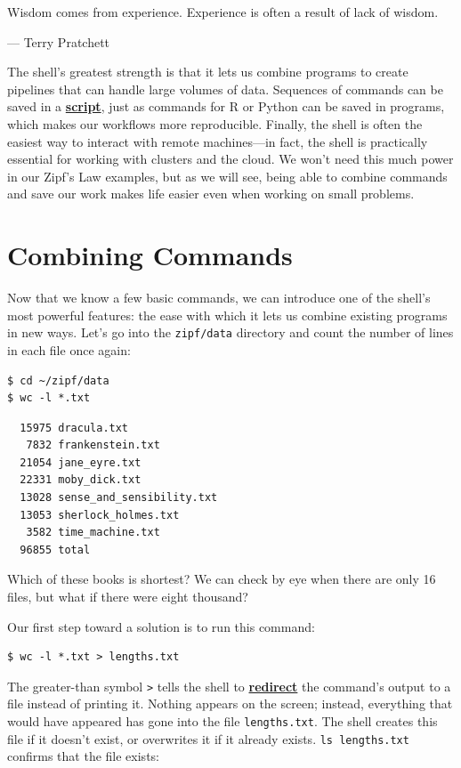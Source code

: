 \documentclass[
]{krantz}
\renewenvironment{quote}{\begin{VF}}{\end{VF}}
\newcommand{\gref}[2]{\hyperlink{#2}{\textbf{#1}}}
\begin{document}
\begin{quote}
Wisdom comes from experience. Experience is often a result of lack of wisdom.

--- Terry Pratchett
\end{quote}

The shell's greatest strength is that
it lets us combine programs to create pipelines
that can handle large volumes of data.
Sequences of commands can be saved in a \gref{script}{script},
just as commands for R or Python can be saved in programs,
which makes our workflows more reproducible.
Finally,
the shell is often the easiest way to interact with remote machines---in fact,
the shell is practically essential for working with clusters and the cloud.
We won't need this much power in our Zipf's Law examples,
but as we will see,
being able to combine commands and save our work
makes life easier even when working on small problems.

\hypertarget{bash-tools-pipe}{%
\section{Combining Commands}\label{bash-tools-pipe}}

Now that we know a few basic commands,
we can introduce one of the shell's most powerful features:
the ease with which it lets us combine existing programs in new ways.
Let's go into the \texttt{zipf/data} directory
and count the number of lines in each file once again:

\begin{verbatim}
$ cd ~/zipf/data
$ wc -l *.txt
\end{verbatim}

\begin{verbatim}
  15975 dracula.txt
   7832 frankenstein.txt
  21054 jane_eyre.txt
  22331 moby_dick.txt
  13028 sense_and_sensibility.txt
  13053 sherlock_holmes.txt
   3582 time_machine.txt
  96855 total
\end{verbatim}

Which of these books is shortest?
We can check by eye when there are only 16 files,
but what if there were eight thousand?

Our first step toward a solution is to run this command:

\begin{verbatim}
$ wc -l *.txt > lengths.txt
\end{verbatim}

The greater-than symbol \texttt{\textgreater{}} tells the shell
to \gref{redirect}{redirection} the command's output to a file instead of printing it.
Nothing appears on the screen;
instead,
everything that would have appeared has gone into the file \texttt{lengths.txt}.
The shell creates this file if it doesn't exist,
or overwrites it if it already exists.
\texttt{ls\ lengths.txt} confirms that the file exists:
\end{document}
